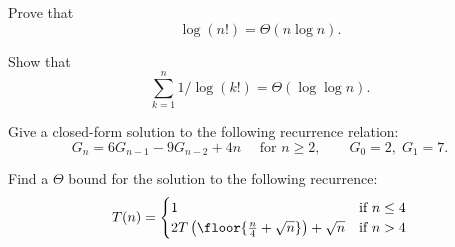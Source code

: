 \documentclass[12pt]{article}
\begin{document}
\newpage

\begin{problem}{10}
    \bparts
Prove that
\[ \log (n!) = \Theta(n\log n). \]
\newpage

 Show that
\[ \sum_{k=1}^n 1/\log (k!) = \Theta(\log \log n). \]

\eparts
\end{problem}

%
%


\newpage
\begin{problem}{10}

Give a closed-form solution to the following recurrence
relation:
\[ G_n = 6G_{n-1} - 9G_{n-2} + 4n \quad \text{ for } n \geq 2, \qquad G_0 = 2,\; G_1 = 7. \]

\end{problem}


\newpage

\begin{problem}{8}
Find a $\Theta$ bound for the solution to the following recurrence:
    \begin{displaymath}
T(n) = 
\begin{cases}
1 & \text{if $n \leq 4$}\\
2T\left(\floor{{n\over 4}+ \sqrt{n}}\right)+\sqrt{n}
&  \text{if $n > 4$}\\
\end{cases}
\end{displaymath}


\end{problem}
\end{document}
